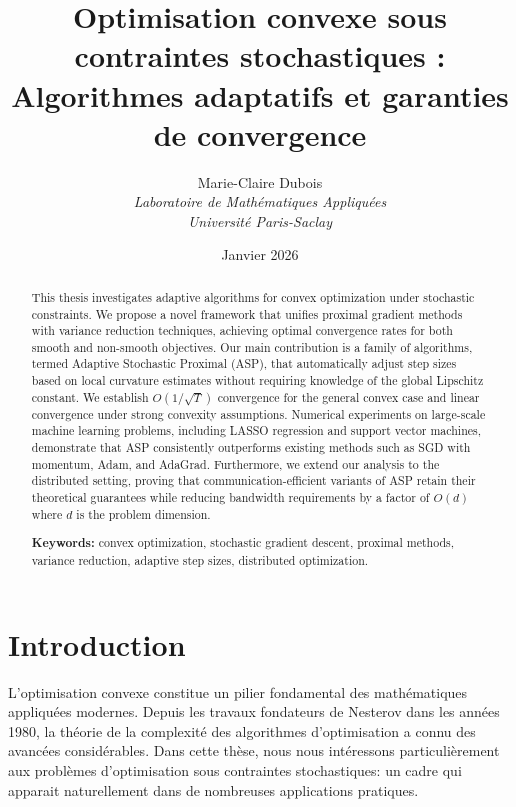 \documentclass[12pt,a4paper]{report}
\title{Optimisation convexe sous contraintes stochastiques :\\
       Algorithmes adaptatifs et garanties de convergence}
\author{Marie-Claire Dubois\\
  \textit{Laboratoire de Math\'ematiques Appliqu\'ees}\\
  \textit{Universit\'e Paris-Saclay}}
\date{Janvier 2026}
\begin{document}
\maketitle

\begin{abstract}
This thesis investigates adaptive algorithms for convex optimization under
stochastic constraints. We propose a novel framework that unifies proximal
gradient methods with variance reduction techniques, achieving optimal
convergence rates for both smooth and non-smooth objectives. Our main
contribution is a family of algorithms, termed Adaptive Stochastic Proximal
(ASP), that automatically adjust step sizes based on local curvature
estimates without requiring knowledge of the global Lipschitz constant.
We establish $O(1/\sqrt{T})$ convergence for the general convex case and
linear convergence under strong convexity assumptions. Numerical experiments
on large-scale machine learning problems, including LASSO regression and
support vector machines, demonstrate that ASP consistently outperforms
existing methods such as SGD with momentum, Adam, and AdaGrad.
Furthermore, we extend our analysis to the distributed setting, proving
that communication-efficient variants of ASP retain their theoretical
guarantees while reducing bandwidth requirements by a factor of $O(d)$
where $d$ is the problem dimension.

\medskip
\noindent\textbf{Keywords:} convex optimization, stochastic gradient descent,
proximal methods, variance reduction, adaptive step sizes, distributed optimization.
\end{abstract}

\tableofcontents

\chapter{Introduction}

L'optimisation convexe constitue un pilier fondamental des math\'ematiques
appliqu\'ees modernes. Depuis les travaux fondateurs de Nesterov dans les
ann\'ees 1980, la th\'eorie de la complexit\'e des algorithmes d'optimisation
a connu des avanc\'ees consid\'erables. Dans cette th\`ese, nous nous
int\'eressons particuli\`erement aux probl\`emes d'optimisation sous
contraintes stochastiques: un cadre qui apparait naturellement dans de
nombreuses applications pratiques.
\end{document}

